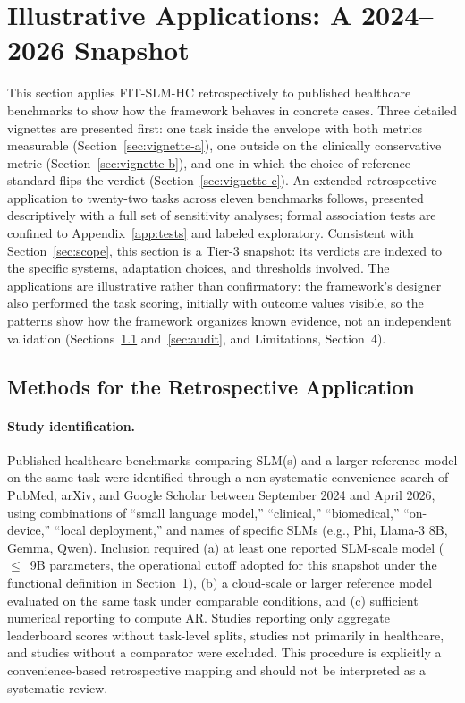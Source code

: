 \documentclass[11pt]{article}
\begin{document}
\section{Illustrative Applications: A 2024--2026 Snapshot}

This section applies FIT-SLM-HC retrospectively to published healthcare benchmarks to show how the framework behaves in concrete cases. Three detailed vignettes are presented first: one task inside the envelope with both metrics measurable (Section~\ref{sec:vignette-a}), one outside on the clinically conservative metric (Section~\ref{sec:vignette-b}), and one in which the choice of reference standard flips the verdict (Section~\ref{sec:vignette-c}). An extended retrospective application to twenty-two tasks across eleven benchmarks follows, presented descriptively with a full set of sensitivity analyses; formal association tests are confined to Appendix~\ref{app:tests} and labeled exploratory. Consistent with Section~\ref{sec:scope}, this section is a Tier-3 snapshot: its verdicts are indexed to the specific systems, adaptation choices, and thresholds involved. The applications are illustrative rather than confirmatory: the framework's designer also performed the task scoring, initially with outcome values visible, so the patterns show how the framework organizes known evidence, not an independent validation (Sections~\ref{sec:methods-retro} and~\ref{sec:audit}, and Limitations, Section~4).

\subsection{Methods for the Retrospective Application}
\label{sec:methods-retro}

\paragraph{Study identification.}
Published healthcare benchmarks comparing SLM(s) and a larger reference model on the same task were identified through a non-systematic convenience search of PubMed, arXiv, and Google Scholar between September 2024 and April 2026, using combinations of ``small language model,'' ``clinical,'' ``biomedical,'' ``on-device,'' ``local deployment,'' and names of specific SLMs (e.g., Phi, Llama-3 8B, Gemma, Qwen). Inclusion required (a) at least one reported SLM-scale model ($\leq$~9B parameters, the operational cutoff adopted for this snapshot under the functional definition in Section~1), (b) a cloud-scale or larger reference model evaluated on the same task under comparable conditions, and (c) sufficient numerical reporting to compute AR. Studies reporting only aggregate leaderboard scores without task-level splits, studies not primarily in healthcare, and studies without a comparator were excluded. This procedure is explicitly a convenience-based retrospective mapping and should not be interpreted as a systematic review.
\end{document}
